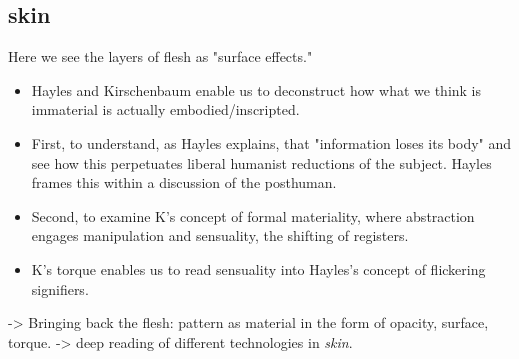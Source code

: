 \documentclass[11pt]{article}
\begin{document}
\subsection{skin}
\label{sec:org089a96c}
Here we see the layers of flesh as "surface effects." 
\begin{itemize}
\item Hayles and Kirschenbaum enable us to deconstruct how what we think
is immaterial is actually embodied/inscripted.
\item First, to understand, as Hayles explains, that "information loses
its body" and see how this perpetuates liberal humanist reductions
of the subject. Hayles frames this within a discussion of the
posthuman.
\item Second, to examine K's concept of formal materiality, where
abstraction engages manipulation and sensuality, the shifting of
registers.
\item K's torque enables us to read sensuality into Hayles's concept of
flickering signifiers.
\end{itemize}

-> Bringing back the flesh: pattern as material in the form of opacity,
  surface, torque.
-> deep reading of different technologies in \emph{skin}. 
\end{document}
